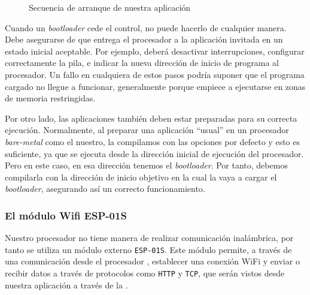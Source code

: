 \documentclass[../main.tex]{subfiles}
\begin{document}
\begin{figure}
            \caption{Secuencia de arranque de nuestra aplicación}
            \label{fig:bootloader_sequence}
        \end{figure}

        Cuando un \emph{bootloader} cede el control, no puede hacerlo de cualquier manera. Debe asegurarse de que entrega el procesador a la aplicación invitada en un estado inicial aceptable. Por ejemplo, deberá desactivar interrupciones, configurar correctamente la pila, e indicar la nueva dirección de inicio de programa al procesador. Un fallo en cualquiera de estos pasos podría suponer que el programa cargado no llegue a funcionar, generalmente porque empiece a ejecutarse en zonas de memoria restringidas.

        Por otro lado, las aplicaciones también deben estar preparadas para su correcta ejecución. Normalmente, al preparar una aplicación ``usual'' en un procesador \emph{bare-metal} como el nuestro, la compilamos con las opciones por defecto y esto es suficiente, ya que se ejecuta desde la dirección inicial de ejecución del procesador. Pero en este caso, en esa dirección tenemos el \emph{bootloader}. Por tanto, debemos compilarla con la dirección de inicio objetivo en la cual la vaya a cargar el \emph{bootloader}, asegurando así un correcto funcionamiento. 

        \subsubsection{El módulo Wifi ESP-01S}

            Nuestro procesador no tiene manera de realizar comunicación inalámbrica, por tanto se utiliza un módulo externo \texttt{ESP-01S}. Este módulo permite, a través de una comunicación  desde el procesador \MCU, establecer una conexión WiFi y enviar o recibir datos a través de protocolos como \texttt{HTTP} y \texttt{TCP}, que serán vistos desde nuestra aplicación a través de la . 
\end{document}
